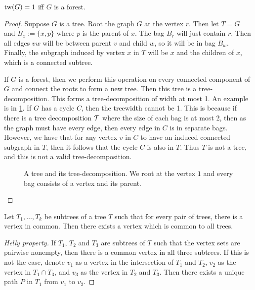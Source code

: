 \begin{lemma}\label{lem:treewidth_forest}
	\(\operatorname{tw}(G) = 1\) iff \(G\) is a forest.
\end{lemma}
\begin{proof}
	Suppose \(G\) is a tree. Root the graph \(G\) at the vertex \(r\). Then let \(T = G\) and \(B_x:= \lbrace x, p \rbrace\) where \(p\) is the parent of \(x\). The bag \(B_r\) will just contain \(r\). Then all edges \(vw\) will be between parent \(v\) and child \(w\), so it will be in bag \(B_w\). Finally, the subgraph induced by vertex \(x\) in \(T\) will be \(x\) and the children of \(x\), which is a connected subtree.

	If \(G\) is a forest, then we perform this operation on every connected component of \(G\) and connect the roots to form a new tree. Then this tree is a tree-decomposition. This forms a tree-decomposition of width at most 1. An example is in \cref{fig:tree-treedecomp}.
	If \(G\) has a cycle \(C\), then the treewidth cannot be 1. This is because if there is a tree decomposition \(\mathcal{T}\) where the size of each bag is at most 2, then as the graph must have every edge, then every edge in \(C\) is in separate bags. However, we have that for any vertex \(v\) in \(C\) to have an induced connected subgraph in \(T\), then it follows that the cycle \(C\) is also in \(T\). Thus \(T\) is not a tree, and this is not a valid tree-decomposition.
	\begin{figure}[ht]
		\centering
		
		
		\caption{A tree and its tree-decomposition. We root at the vertex \(1\) and every bag consists of a vertex and its parent.}
		\label{fig:tree-treedecomp}
	\end{figure}
\end{proof}

\begin{lemma}\label{lem:Helly}
	Let \(T_1, \ldots, T_k\) be subtrees of a tree \(T\) such that for every pair of trees, there is a vertex in common. Then there exists a vertex which is common to all trees.
\end{lemma}
\begin{proof}[Helly property]
	If \(T_1\), \(T_2\) and \(T_3\) are subtrees of \(T\) such that the vertex sets are pairwise nonempty, then there is a common vertex in all three subtrees. If this is not the case, denote \(v_1\) as a vertex in the intersection of \(T_1\) and \(T_2\), \(v_2\) as the vertex in \(T_1 \cap T_3\), and \(v_3\) as the vertex in \(T_2\) and \(T_3\). Then there exists a unique path \(P\) in \(T_1\) from \(v_1\) to \(v_2\).
\end{proof}


